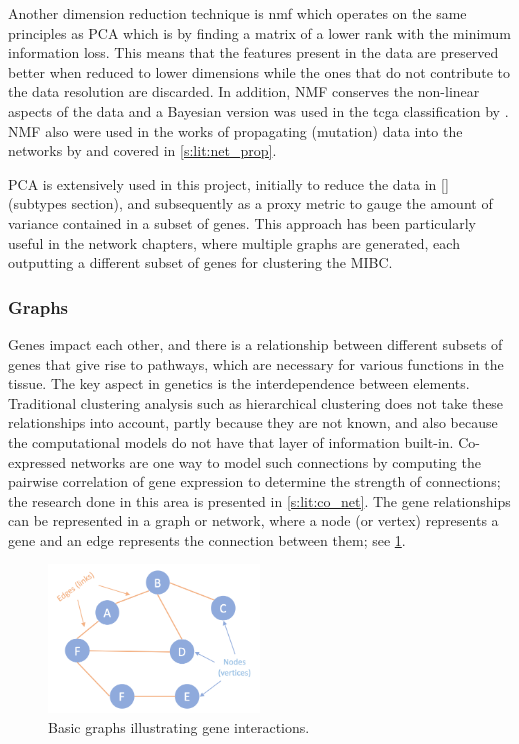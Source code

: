 Another dimension reduction technique is \acrfull{nmf} which operates on the same principles as PCA which is by finding a matrix of a lower rank with the minimum information loss. This means that the features present in the data are preserved better when reduced to lower dimensions while the ones that do not contribute to the data resolution are discarded. In addition, NMF conserves the non-linear aspects of the data and a Bayesian version was used in the \acrfull{tcga} classification by \citet{Robertson2017-mg}. NMF also were used in the works of propagating (mutation) data into the networks by \citet{Yang2016-dm, Cai2008-fv} and covered in \cref{s:lit:net_prop}.

PCA is extensively used in this project, initially to reduce the data in \ref{} (subtypes section), and subsequently as a proxy metric to gauge the amount of variance contained in a subset of genes. This approach has been particularly useful in the network chapters, where multiple graphs are generated, each outputting a different subset of genes for clustering the MIBC.


\subsubsection{Graphs} \label{s:lit:graph_overview}

Genes impact each other, and there is a relationship between different subsets of genes that give rise to pathways, which are necessary for various functions in the tissue. The key aspect in genetics is the interdependence between elements. Traditional clustering analysis such as hierarchical clustering does not take these relationships into account, partly because they are not known, and also because the computational models do not have that layer of information built-in. Co-expressed networks are one way to model such connections by computing the pairwise correlation of gene expression to determine the strength of connections; the research done in this area is presented in \cref{s:lit:co_net}. The gene relationships can be represented in a graph or network, where a node (or vertex) represents a gene and an edge represents the connection between them; see \cref{fig:graphs_basic}.

\begin{figure}[!htb]
  \centering\includegraphics[width=0.5\textwidth,height=0.5\textheight,keepaspectratio]{Sections/Lit_review/Resources/basic_graphs.png}
    \caption{Basic graphs illustrating gene interactions.}
    \label{fig:graphs_basic}
\end{figure}

